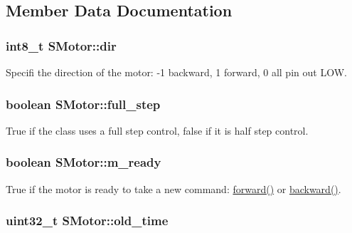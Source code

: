 \subsection{Member Data Documentation}
\hypertarget{class_s_motor_ad5bca9af6abc32a4c501ab8791c9b044}{
\subsubsection[{dir}]{\setlength{\rightskip}{0pt plus 5cm}int8\+\_\+t S\+Motor\+::dir\hspace{0.3cm}{\ttfamily [private]}}}\label{class_s_motor_ad5bca9af6abc32a4c501ab8791c9b044}


Specifi the direction of the motor\+: -\/1 backward, 1 forward, 0 all pin out L\+O\+W. 

\hypertarget{class_s_motor_a91a0e1b7858e925219aef3f01581a6df}{
\subsubsection[{full\+\_\+step}]{\setlength{\rightskip}{0pt plus 5cm}boolean S\+Motor\+::full\+\_\+step\hspace{0.3cm}{\ttfamily [private]}}}\label{class_s_motor_a91a0e1b7858e925219aef3f01581a6df}


True if the class uses a full step control, false if it is half step control. 

\hypertarget{class_s_motor_a387fdb2f979f0a98629f60e6d39e88eb}{
\subsubsection[{m\+\_\+ready}]{\setlength{\rightskip}{0pt plus 5cm}boolean S\+Motor\+::m\+\_\+ready\hspace{0.3cm}{\ttfamily [private]}}}\label{class_s_motor_a387fdb2f979f0a98629f60e6d39e88eb}


True if the motor is ready to take a new command\+: \hyperlink{class_s_motor_ae266c2af254d76012b8132bb7641628d}{forward()} or \hyperlink{class_s_motor_a9d666d613dffcc324e0ae6e1e0a31a3f}{backward()}. 

\hypertarget{class_s_motor_ae1327bd40d192a2fd84ab885a2b197bb}{
\subsubsection[{old\+\_\+time}]{\setlength{\rightskip}{0pt plus 5cm}uint32\+\_\+t S\+Motor\+::old\+\_\+time\hspace{0.3cm}{\ttfamily [private]}}}\label{class_s_motor_ae1327bd40d192a2fd84ab885a2b197bb}


